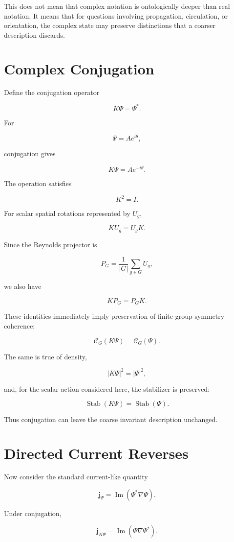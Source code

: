 This does not mean that complex notation is ontologically deeper than real notation. It means that for questions involving propagation, circulation, or orientation, the complex state may preserve distinctions that a coarser description discards.

\section{Complex Conjugation}

Define the conjugation operator

\[
K\Psi=\Psi^*.
\]

For

\[
\Psi=Ae^{i\theta},
\]

conjugation gives

\[
K\Psi=Ae^{-i\theta}.
\]

The operation satisfies

\[
K^2=I.
\]

For scalar spatial rotations represented by $U_g$,

\[
KU_g=U_gK.
\]

Since the Reynolds projector is

\[
P_G=\frac{1}{|G|}\sum_{g\in G}U_g,
\]

we also have

\[
KP_G=P_GK.
\]

These identities immediately imply preservation of finite-group symmetry coherence:

\[
\mathcal C_G(K\Psi)=\mathcal C_G(\Psi).
\]

The same is true of density,

\[
|K\Psi|^2=|\Psi|^2,
\]

and, for the scalar action considered here, the stabilizer is preserved:

\[
\operatorname{Stab}(K\Psi)=\operatorname{Stab}(\Psi).
\]

Thus conjugation can leave the coarse invariant description unchanged.

\section{Directed Current Reverses}

Now consider the standard current-like quantity

\[
\mathbf j_{\Psi}
=
\operatorname{Im}(\Psi^*\nabla\Psi).
\]

Under conjugation,

\[
\mathbf j_{K\Psi}
=
\operatorname{Im}(\Psi\nabla\Psi^*).
\]

